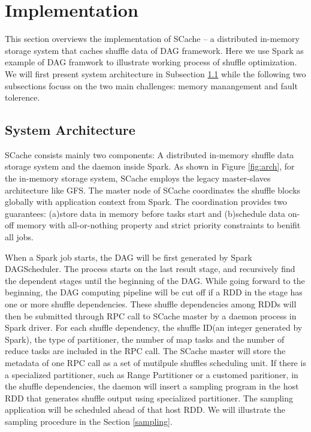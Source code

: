 \section{Implementation}\label{impl}
This section overviews the implementation of SCache -- a distributed in-memory storage system that caches shuffle data of DAG framework. Here we use Spark as example of DAG framwork to illustrate working process of shuffle optimization. We will first present system architecture in Subsection \ref{arch} while the following two subsections focuss on the two main challenges: memory manangement and fault tolerence.

\subsection{System Architecture}\label{arch}
SCache consists mainly two components: A distributed in-memory shuffle data storage system and the daemon inside Spark. As shown in Figure \ref{fig:arch}, for the in-memory storage system, SCache employs the legacy master-slaves architecture like GFS\cite{gfs}. The master node of SCache coordinates the shuffle blocks globally with application context from Spark. The coordination provides two guarantees: (a)store data in memory before tasks start and (b)schedule data on-off memory with all-or-nothing property and strict priority constraints to benifit all jobs. 

When a Spark job starts, the DAG will be first generated by Spark DAGScheduler\cite{sparksource}. The process starts on the last result stage, and recursively find the dependent stages until the beginning of the DAG. While going forward to the beginning, the DAG computing pipeline will be cut off if a RDD in the stage has one or more shuffle dependencies. These shuffle dependencies among RDDs will then be submitted through RPC call to SCache master by a daemon process in Spark driver. For each shuffle dependency, the shuffle ID(an integer generated by Spark), the type of partitioner, the number of map tasks and the number of reduce tasks are included in the RPC call. The SCache master will store the metadata of one RPC call as a set of mutilpule shuffles scheduling unit. If there is a specialized partitioner, such as Range Partitioner or a customed paritioner, in the shuffle dependencies, the daemon will insert a sampling program in the host RDD that generates shuffle output using specialized partitioner. The sampling application will be scheduled ahead of that host RDD. We will illustrate the sampling procedure in the Section \ref{sampling}.

